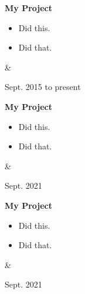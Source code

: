 \documentclass[10pt, letterpaper]{article}
\newenvironment{highlights}{
        \begin{itemize}[
                topsep=0pt,
                parsep=0.10 cm,
                partopsep=0pt,
                itemsep=0pt,
                after=\vspace{-1\baselineskip},
                leftmargin=0.4 cm + 3pt
            ]
    }{
        \end{itemize}
    } %
\let\originalTabularx\tabularx
\let\originalEndTabularx\endtabularx
\renewenvironment{tabularx}{\bgroup\centering\originalTabularx}{\originalEndTabularx\par\egroup}
\begin{document}
        \vspace{0.2 cm}
        \begin{tabularx}{
            \textwidth-0.4 cm-0.13cm
        }{
            K{0.2 cm}
            R{4.1 cm}
        }
            \textbf{My Project}

            \vspace{0.10 cm}

            \begin{highlights}
                \item Did this.
                \item Did that.
            \end{highlights}
            &
            

            Sept. 2015 to present
        \end{tabularx}


        \vspace{0.2 cm}
        \begin{tabularx}{
            \textwidth-0.4 cm-0.13cm
        }{
            K{0.2 cm}
            R{4.1 cm}
        }
            \textbf{My Project}

            \vspace{0.10 cm}

            \begin{highlights}
                \item Did this.
                \item Did that.
            \end{highlights}
            &
            

            Sept. 2021
        \end{tabularx}


        \vspace{0.2 cm}
        \begin{tabularx}{
            \textwidth-0.4 cm-0.13cm
        }{
            K{0.2 cm}
            R{4.1 cm}
        }
            \textbf{My Project}

            \vspace{0.10 cm}

            \begin{highlights}
                \item Did this.
                \item Did that.
            \end{highlights}
            &
            

            Sept. 2021
        \end{tabularx}
\end{document}
